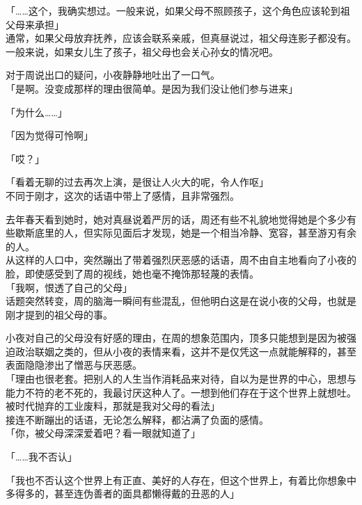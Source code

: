 「……这个，我确实想过。一般来说，如果父母不照顾孩子，这个角色应该轮到祖父母来承担」\\

通常，如果父母放弃抚养，应该会联系亲戚，但真昼说过，祖父母连影子都没有。一般来说，如果女儿生了孩子，祖父母也会关心孙女的情况吧。

对于周说出口的疑问，小夜静静地吐出了一口气。\\

「是啊。没变成那样的理由很简单。是因为我们没让他们参与进来」

「为什么……」

「因为觉得可怜啊」

「哎？」

「看着无聊的过去再次上演，是很让人火大的呢，令人作呕」\\

不同于刚才，这次的话语中带上了感情，且非常强烈。

去年春天看到她时，她对真昼说着严厉的话，周还有些不礼貌地觉得她是个多少有些歇斯底里的人，但实际见面后才发现，她是一个相当冷静、宽容，甚至游刃有余的人。\\

从这样的人口中，突然蹦出了带着强烈厌恶感的话语，周不由自主地看向了小夜的脸，即使感受到了周的视线，她也毫不掩饰那轻蔑的表情。\\

「我啊，恨透了自己的父母」\\

话题突然转变，周的脑海一瞬间有些混乱，但他明白这是在说小夜的父母，也就是刚才提到的祖父母的事。

小夜对自己的父母没有好感的理由，在周的想象范围内，顶多只能想到是因为被强迫政治联姻之类的，但从小夜的表情来看，这并不是仅凭这一点就能解释的，甚至表面隐隐渗出了憎恶与厌恶感。\\

「理由也很老套。把别人的人生当作消耗品来对待，自以为是世界的中心，思想与能力不符的老不死的，我最讨厌这种人了。一想到他们存在于这个世界上就想吐。被时代抛弃的工业废料，那就是我对父母的看法」\\

接连不断蹦出的话语，无论怎么解释，都沾满了负面的感情。\\

「你，被父母深深爱着吧？看一眼就知道了」

「……我不否认」

「我也不否认这个世界上有正直、美好的人存在，但这个世界上，有着比你想象中多得多的，甚至连伪善者的面具都懒得戴的丑恶的人」

